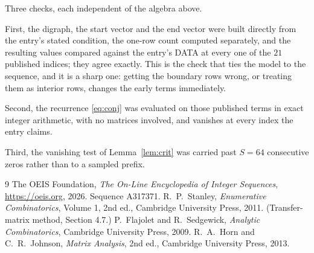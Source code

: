 \documentclass[11pt,a4paper]{article}
\theoremstyle{plain}
\theoremstyle{definition}
\begin{document}
Three checks, each independent of the algebra above.

First, the digraph, the start vector and the end vector were built directly from the
entry's stated condition, the one-row count computed separately, and the resulting values
compared against the entry's DATA at every one of the $21$ published indices; they
agree exactly. This is the check that ties the model to the sequence, and it is a sharp one:
getting the boundary rows wrong, or treating them as interior rows, changes the early terms
immediately.

Second, the recurrence \eqref{eq:conj} was evaluated on those published terms in exact
integer arithmetic, with no matrices involved, and vanishes at every index the entry claims.

Third, the vanishing test of Lemma~\ref{lem:crit} was carried past $S=64$ consecutive
zeros rather than to a sampled prefix.

\begin{thebibliography}{9}
 The OEIS Foundation, \emph{The On-Line Encyclopedia of Integer
Sequences}, \url{https://oeis.org}, 2026. Sequence A317371.
 R.~P.~Stanley, \emph{Enumerative Combinatorics}, Volume 1, 2nd ed.,
Cambridge University Press, 2011. (Transfer-matrix method, Section 4.7.)
 P.~Flajolet and R.~Sedgewick, \emph{Analytic Combinatorics}, Cambridge
University Press, 2009.
 R.~A.~Horn and C.~R.~Johnson, \emph{Matrix Analysis}, 2nd ed., Cambridge
University Press, 2013.
\end{thebibliography}
\end{document}
